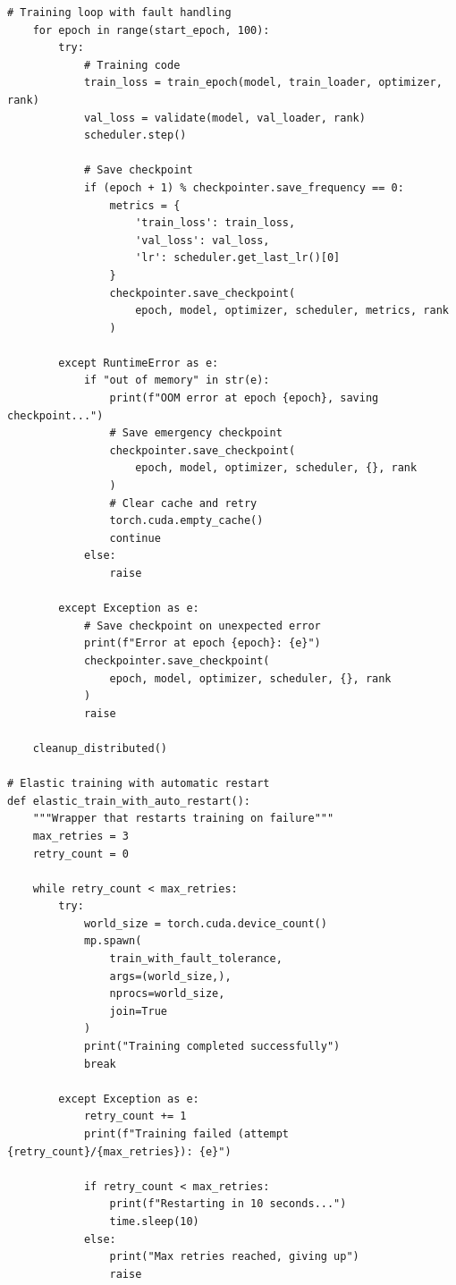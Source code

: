 \begin{lstlisting}[style=python, caption=Fault-tolerant training with elastic checkpointing]
    # Training loop with fault handling
    for epoch in range(start_epoch, 100):
        try:
            # Training code
            train_loss = train_epoch(model, train_loader, optimizer, rank)
            val_loss = validate(model, val_loader, rank)
            scheduler.step()

            # Save checkpoint
            if (epoch + 1) % checkpointer.save_frequency == 0:
                metrics = {
                    'train_loss': train_loss,
                    'val_loss': val_loss,
                    'lr': scheduler.get_last_lr()[0]
                }
                checkpointer.save_checkpoint(
                    epoch, model, optimizer, scheduler, metrics, rank
                )

        except RuntimeError as e:
            if "out of memory" in str(e):
                print(f"OOM error at epoch {epoch}, saving checkpoint...")
                # Save emergency checkpoint
                checkpointer.save_checkpoint(
                    epoch, model, optimizer, scheduler, {}, rank
                )
                # Clear cache and retry
                torch.cuda.empty_cache()
                continue
            else:
                raise

        except Exception as e:
            # Save checkpoint on unexpected error
            print(f"Error at epoch {epoch}: {e}")
            checkpointer.save_checkpoint(
                epoch, model, optimizer, scheduler, {}, rank
            )
            raise

    cleanup_distributed()

# Elastic training with automatic restart
def elastic_train_with_auto_restart():
    """Wrapper that restarts training on failure"""
    max_retries = 3
    retry_count = 0

    while retry_count < max_retries:
        try:
            world_size = torch.cuda.device_count()
            mp.spawn(
                train_with_fault_tolerance,
                args=(world_size,),
                nprocs=world_size,
                join=True
            )
            print("Training completed successfully")
            break

        except Exception as e:
            retry_count += 1
            print(f"Training failed (attempt {retry_count}/{max_retries}): {e}")

            if retry_count < max_retries:
                print(f"Restarting in 10 seconds...")
                time.sleep(10)
            else:
                print("Max retries reached, giving up")
                raise
\end{lstlisting}

